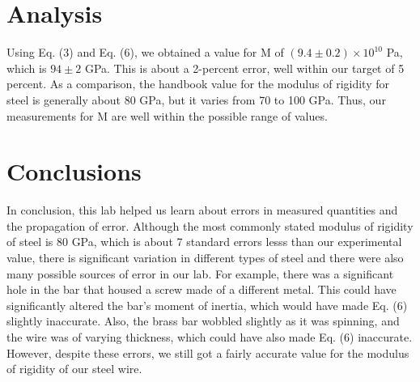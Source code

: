 \documentclass[leqno]{article}
\begin{document}
\section*{Analysis}
Using Eq. (3) and Eq. (6), we obtained a value for M of $(9.4\pm0.2)\times10^{10}$ Pa, which is $94\pm2$ GPa.  This is about a 2-percent error, well within our target of 5 percent.  As a comparison, the handbook value for the modulus of rigidity for steel is generally about 80 GPa, but it varies from 70 to 100 GPa.  Thus, our measurements for M are well within the possible range of values.
\section*{Conclusions}
In conclusion, this lab helped us learn about errors in measured quantities and the propagation of error.  Although the most commonly stated modulus of rigidity of steel is 80 GPa, which is about 7 standard errors lesss than our experimental value, there is significant variation in different types of steel and there were also many possible sources of error in our lab.  For example, there was a significant hole in the bar that housed a screw made of a different metal.  This could have significantly altered the bar's moment of inertia, which would have made Eq. (6) slightly inaccurate.  Also, the brass bar wobbled slightly as it was spinning, and the wire was of varying thickness, which could have also made Eq. (6) inaccurate.  However, despite these errors, we still got a fairly accurate value for the modulus of rigidity of our steel wire.
\newpage
\end{document}
